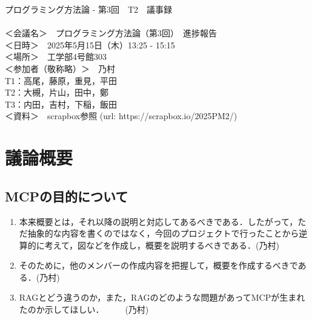 \documentclass[dvipdfmx]{jsarticle}
\begin{document}
プログラミング方法論 - 第3回　T2　議事録\\
\\
＜会議名＞　プログラミング方法論（第3回）　進捗報告\\
＜日時＞　2025年5月15日（木）13:25 - 15:15\\
＜場所＞　工学部4号館303\\
＜参加者（敬称略）＞　乃村\\
T1：高尾，藤原，重見，平田\\
T2：大槻，片山，田中，鄭\\
T3：内田，吉村，下稲，飯田\\

＜資料＞　scrapbox参照 (url: https://scrapbox.io/2025PM2/)\\

\section{議論概要}
\subsection{MCPの目的について}
\begin{enumerate}
    \item 本来概要とは，それ以降の説明と対応してあるべきである．したがって，ただ抽象的な内容を書くのではなく，今回のプロジェクトで行ったことから逆算的に考えて，図などを作成し，概要を説明するべきである．\hfill{(乃村)}\\
    \item そのために，他のメンバーの作成内容を把握して，概要を作成するべきである．\hfill{(乃村)}
    \item RAGとどう違うのか，また，RAGのどのような問題があってMCPが生まれたのか示してほしい．　　　\hfill{(乃村)}\\
\end{enumerate}
\end{document}

